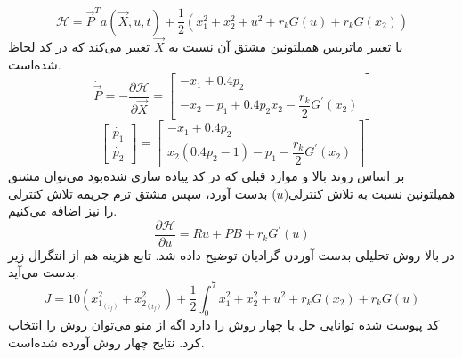 \documentclass[12 pt]{article}
\begin{document}
$$
\mathcal{H} = \vec{P}^Ta(\vec{X}, u, t) + \frac12\left(x_1^2 + x_2^2 + u^2 + r_kG(u) + r_kG(x_2)\right)
$$
با تغییر ماتریس همیلتونین مشتق آن نسبت به 
$\vec{X}$
 تغییر می‌کند که در کد لحاظ شده‌است.
 $$\dot{\vec{P}} = -\dfrac{\partial \mathcal{H}}{\partial \vec{X}} = \begin{bmatrix}
 	-x_1 + 0.4p_2 \\
 	-x_2  - p_1 + 0.4 p_2x_2 - \dfrac{r_k}{2}G^{\prime}(x_2)
 \end{bmatrix}$$
 $$\begin{bmatrix}
 	\dot{p_1}\\
 	\dot{p_2}
 \end{bmatrix} = \begin{bmatrix}
	-x_1 + 0.4p_2 \\
	 x_2(0.4 p_2-1)  - p_1 - \dfrac{r_k}{2}G^{\prime}(x_2)
\end{bmatrix}$$
بر اساس روند بالا و موارد قبلی که در کد پیاده سازی شده‌بود می‌توان مشتق همیلتونین نسبت به تلاش کنترلی($u$) بدست آورد، سپس مشتق ترم جریمه تلاش کنترلی را نیز اضافه می‌کنیم.
$$
\dfrac{\partial \mathcal{H}}{\partial u} = Ru + PB + r_kG^{\prime}(u)
$$
در بالا روش تحلیلی بدست آوردن گرادیان توضیح داده شد.
تابع هزینه هم از انتگرال زیر بدست می‌آید.
$$J = 10(x_{1_{(t_f)}}^2 + x_{2_{(t_f)}}^2) +\frac{1}{2}\int_0^7 x_1^2 + x_2^2 + u^2 + r_kG(x_2) + r_kG(u)$$
کد پیوست شده توانایی حل با چهار روش را دارد اگه از منو می‌توان روش را انتخاب کرد. نتایح چهار روش آورده شده‌است.
\newpage
{}
\end{document}
